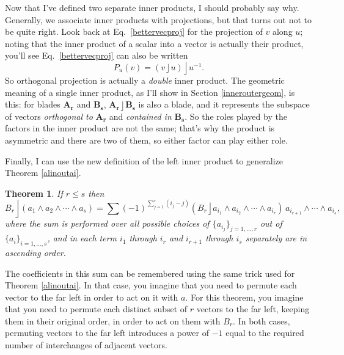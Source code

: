 \documentclass{utarticle}
\newcommand{\bl}[1]{\ensuremath{\bm{#1}}}
\DeclareMathOperator{\lin}{\rfloor}
\DeclareMathOperator{\out}{\wedge}
\newtheorem{thm}{Theorem}
\begin{document}
Now that I've defined two separate inner products, I should probably say why.  
Generally, we associate inner products with projections, but that turns out not to
be quite right.  Look back at Eq.~\eqref{bettervecproj} for the projection of $v$ along 
$u$; noting that the inner product of a scalar into
a vector is actually their product, you'll see Eq.~\eqref{bettervecproj} can also be written
\begin{equation}  
P_u(v) = (v \lin u) \lin u^{-1}.
\end{equation}
So orthogonal projection is actually a \emph{double} inner product.  The geometric 
meaning of a single inner product, as I'll show in Section \ref{inneroutergeom}, is this:  
for blades \bl{A_r} and \bl{B_s}, $\bl{A_r} \lin \bl{B_s}$ is also 
a blade, and it represents the subspace of vectors \emph{orthogonal to} \bl{A_r} 
and \emph{contained in} \bl{B_s}.  So the roles played by the factors in the inner 
product are not the same; that's why the product is asymmetric and there are 
two of them, so either factor can play either role.

Finally, I can use the new definition of the left inner product to generalize 
Theorem \ref{alinoutai}.
\begin{thm}
If $r \leq s$ then
\begin{equation}
B_r \lin (a_1 \out a_2 \out \dotsb \out a_s) = \sum
    (-1)^{\sum_{j=1}^r (i_j - j)} (B_r \lin a_{i_1} \out a_{i_2} \out 
    \dotsb \out a_{i_r}) \, a_{i_{r+1}} \out \dotsb \out 
    a_{i_s},
\label{mveclinoutid}
\end{equation}
where the sum is performed over all possible choices of $\{a_{i_j}\}_{j=1, \dotsc,r}$ 
out of $\{a_i\}_{i=1,\dotsc,s}$, and in each term $i_1$ through 
$i_r$ and $i_{r+1}$ through $i_s$ separately are in ascending order.  
\label{Brlinoutai}
\end{thm}
The coefficients in this sum can be remembered using the same trick used for
Theorem \ref{alinoutai}.  In that case, you imagine that you need to permute 
each vector to the far left in order to act on it with $a$.  For this theorem, you 
imagine that you need to permute each distinct subset of $r$ vectors to the far left, 
keeping them in their original order, in order to act on them with $B_r$.  In 
both cases, permuting vectors to the far left introduces a power of $-1$ equal to 
the required number of interchanges of adjacent vectors.  
\end{document}
